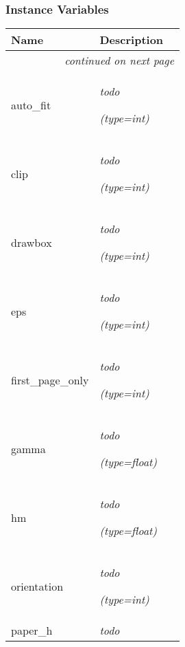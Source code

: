 
  \subsubsection{Instance Variables}

    \vspace{-1cm}
\hspace{\varindent}\begin{longtable}{|p{\varnamewidth}|p{\vardescrwidth}|l}
\cline{1-2}
\cline{1-2} \centering \textbf{Name} & \centering \textbf{Description}& \\
\cline{1-2}
\endhead\cline{1-2}\multicolumn{3}{r}{\small\textit{continued on next page}}\\\endfoot\cline{1-2}
\endlastfoot\raggedright a\-u\-t\-o\-\_\-f\-i\-t\- & \raggedright \emph{todo}

            {\it (type=int)}&\\
\cline{1-2}
\raggedright c\-l\-i\-p\- & \raggedright \emph{todo}

            {\it (type=int)}&\\
\cline{1-2}
\raggedright d\-r\-a\-w\-b\-o\-x\- & \raggedright \emph{todo}

            {\it (type=int)}&\\
\cline{1-2}
\raggedright e\-p\-s\- & \raggedright \emph{todo}

            {\it (type=int)}&\\
\cline{1-2}
\raggedright f\-i\-r\-s\-t\-\_\-p\-a\-g\-e\-\_\-o\-n\-l\-y\- & \raggedright \emph{todo}

            {\it (type=int)}&\\
\cline{1-2}
\raggedright g\-a\-m\-m\-a\- & \raggedright \emph{todo}

            {\it (type=float)}&\\
\cline{1-2}
\raggedright h\-m\- & \raggedright \emph{todo}

            {\it (type=float)}&\\
\cline{1-2}
\raggedright o\-r\-i\-e\-n\-t\-a\-t\-i\-o\-n\- & \raggedright \emph{todo}

            {\it (type=int)}&\\
\cline{1-2}
\raggedright p\-a\-p\-e\-r\-\_\-h\- & \raggedright \emph{todo}


\end{longtable}
